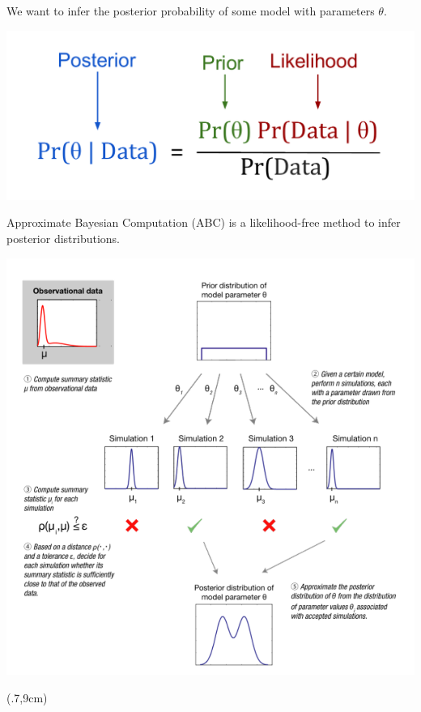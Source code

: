 \documentclass{beamer}
\newcommand\mycite[1]{%
  \begin{textblock*}{5cm}(.7\textwidth,9cm)%
    #1
  \end{textblock*}
}
\begin{document}
\begin{frame}{We want to infer the posterior probability of some
 model with parameters $\theta$. }
\begin{center}
\includegraphics[scale=.65]{Bayes_theorem.pdf}
\end{center}
\end{frame}

\begin{frame}{Approximate Bayesian Computation (ABC) is a likelihood-free method to infer posterior distributions.}
\begin{center}
\includegraphics[scale=.38]{ABC.pdf}
\end{center}
\mycite{\cite{Sunnaker:2013}}
\end{frame}
\end{document}
